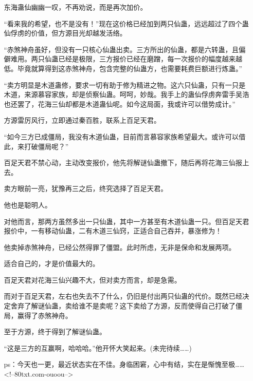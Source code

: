 \begin{this_body}
东海蛊仙幽幽一叹，不再劝说，而是再次加价。

“看来我的希望，也不是没有！”现在这价格已经加到两只仙蛊，远远超过了四个蛊仙俘虏的价值，但方源目光却越发活络。

“赤煞神舟虽好，但没有一只核心仙蛊出卖。三方所出的仙蛊，都是六转蛊，且偏僻难用。两只仙蛊已经是极限，三方报价已经在磨蹭，每一次报价的幅度越来越低。毕竟就算得到这赤煞神舟，包含完整的仙蛊方，也需要耗费巨额进行炼蛊。”

“卖方明显是木道蛊修，要求一切有助于修为精进之物。这六只仙蛊，只有一只是木道，来源慕容家族，却是侦察仙蛊。呵呵，妙哉。我手上的蛊仙俘虏奔雷手吴浩也还罢了，花海三仙却都是木道蛊仙呢。如今这局面，我或许可以借势成计。”

方源雷厉风行，立即通过秦百胜，联系上百足天君。

“如今三方已成僵局，我没有木道仙蛊，目前而言慕容家族希望最大。或许可以借此，来打破僵局呢？”

百足天君不禁心动，主动改变报价，他先将解谜仙蛊撤下，随后再将花海三仙报上去。

卖方眼前一亮，犹豫再三之后，终究选择了百足天君。

他也是聪明人。

对他而言，那两方虽然多出一只仙蛊，其中一方甚至有木道仙蛊一只。但百足天君报价中，一有移动仙蛊，二有木道三仙窍，正适合自己吞并，暴涨修为！

他卖掉赤煞神舟，已经公然得罪了僵盟。此时所虑，无非是保命和发展两项。

适合自己的，才是价值最大的。

百足天君对花海三仙兴趣不大，但对卖方而言，却是急需。

而对于百足天君，左右也失去不了什么，仍旧是付出两只仙蛊的代价。既然已经决定舍弃了解谜仙蛊，卖给谁不是卖呢？这下卖给了方源，反而使得自己打破了僵局，赢得了赤煞神舟。

至于方源，终于得到了解谜仙蛊。

“这是三方的互赢啊，哈哈哈。”他开怀大笑起来。(未完待续……)

ps：今天也一更，最近状态实在不佳。身临困窘，心中有结，实在是惭愧至极……<!--80txt.com-ouoou-->

\end{this_body}

